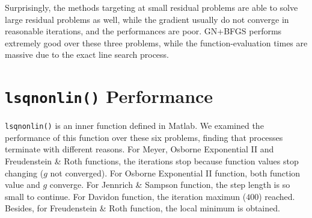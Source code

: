 \documentclass[11pt,a4paper]{article}
\begin{document}
Surprisingly, the methods targeting at small residual problems are able to solve large residual problems as well, while the gradient usually do not converge in reasonable iterations, and the performances are poor. GN+BFGS performs extremely good over these three problems, while the function-evaluation times are massive due to the exact line search process.

\section{\texttt{lsqnonlin()} Performance}

\texttt{lsqnonlin()} is an inner function defined in Matlab. We examined the performance of this function over these six problems, finding that processes terminate with different reasons. For Meyer, Osborne Exponential II and Freudenstein \& Roth functions, the iterations stop because function values stop changing ($g$ not converged). For Osborne Exponential II function, both function value and $g$ converge. For Jennrich \& Sampson function, the step length is so small to continue. For Davidon function, the iteration maximun ($400$) reached. Besides, for Freudenstein \& Roth function, the local minimum is obtained.
\end{document}
